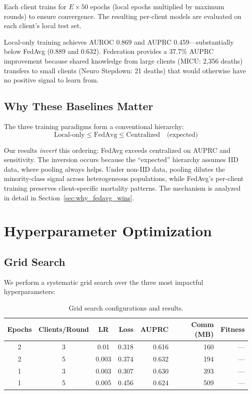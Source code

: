 \documentclass[11pt,a4paper]{report}
\begin{document}
Each client trains for $E \times 50$ epochs (local epochs multiplied by maximum rounds) to ensure convergence. The resulting per-client models are evaluated on each client's local test set.

Local-only training achieves AUROC 0.869 and AUPRC 0.459---substantially below FedAvg ($0.889$ and $0.632$). Federation provides a 37.7\% AUPRC improvement because shared knowledge from large clients (MICU: 2,356 deaths) transfers to small clients (Neuro Stepdown: 21 deaths) that would otherwise have no positive signal to learn from.

\section{Why These Baselines Matter}

The three training paradigms form a conventional hierarchy:
\begin{equation}
\text{Local-only} \leq \text{FedAvg} \leq \text{Centralized} \quad \text{(expected)}
\end{equation}

Our results \emph{invert} this ordering: FedAvg exceeds centralized on AUPRC and sensitivity. The inversion occurs because the ``expected'' hierarchy assumes IID data, where pooling always helps. Under non-IID data, pooling dilutes the minority-class signal across heterogeneous populations, while FedAvg's per-client training preserves client-specific mortality patterns. The mechanism is analyzed in detail in Section~\ref{sec:why_fedavg_wins}.


\chapter{Hyperparameter Optimization}

\section{Grid Search}

We perform a systematic grid search over the three most impactful hyperparameters:

\begin{table}[H]
\centering
\caption{Grid search configurations and results.}
\label{tab:grid}
\begin{tabular}{cccrrrr}
\toprule
\textbf{Epochs} & \textbf{Clients/Round} & \textbf{LR} & \textbf{Loss} & \textbf{AUPRC} & \textbf{Comm (MB)} & \textbf{Fitness} \\
\midrule
2 & 3 & 0.01 & 0.318 & 0.616 & 160 & --- \\
2 & 5 & 0.003 & 0.374 & 0.632 & 194 & --- \\
1 & 3 & 0.003 & 0.307 & 0.630 & 393 & --- \\
1 & 5 & 0.005 & 0.456 & 0.624 & 509 & --- \\
\bottomrule
\end{tabular}
\end{table}
\end{document}
